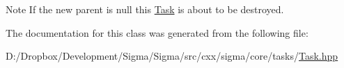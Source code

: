 \begin{DoxyNote}{Note}
If the new parent is null this \hyperlink{classsigma_1_1core_1_1tasks_1_1_task}{Task} is about to be destroyed. 
\end{DoxyNote}


The documentation for this class was generated from the following file\+:\begin{DoxyCompactItemize}
\item 
D\+:/\+Dropbox/\+Development/\+Sigma/\+Sigma/src/cxx/sigma/core/tasks/\hyperlink{_task_8hpp}{Task.\+hpp}\end{DoxyCompactItemize}
